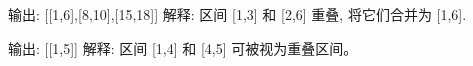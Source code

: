 输出: [[1,6],[8,10],[15,18]]
解释: 区间 [1,3] 和 [2,6] 重叠, 将它们合并为 [1,6].

输出: [[1,5]]
解释: 区间 [1,4] 和 [4,5] 可被视为重叠区间。
